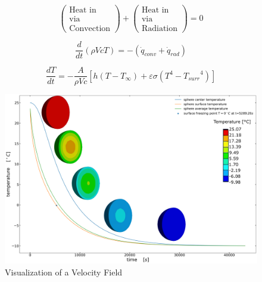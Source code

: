 \documentclass{article}
\begin{document}
\begin{dmath}
\left( \begin{matrix}
\textrm{Heat in}\\
\textrm{via}\\
\textrm{Convection}
\end{matrix} \right) +
\left( \begin{matrix}
\textrm{Heat in}\\
\textrm{via}\\
\textrm{Radiation}
\end{matrix} \right) = 0
\end{dmath}

\begin{dmath}
\frac{d}{d t} (\rho V c T) = -(\dot{q}_{conv} + \dot{q}_{rad})
\end{dmath}

\begin{dmath}
\frac{d T}{d t} = - \frac{A}{\rho V c} \left[ h (T - T_{\infty}) + \varepsilon \sigma (T^4 - {T_{surr}}^4) \right]
\end{dmath}

\begin{figure}[h!]
	\centering
	\includegraphics[width=1.00\textwidth]{./sphereTemps.png}
	\caption{Visualization of a Velocity Field}
	\label{img:sphereTemps}
\end{figure}
\end{document}

